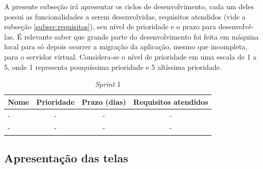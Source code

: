 A presente subseção irá apresentar os ciclos de desenvolvimento, cada um deles possui as funcionalidades a serem desenvolvidas, requisitos atendidos (vide a subseção \ref{subsec:requisitos}), seu nível de prioridade e o prazo para desenvolvê-las. É relevante saber que grande parte do desenvolvimento foi feita em máquina local para só depois ocorrer a migração da aplicação, mesmo que incompleta, para o servidor virtual. Considera-se o nível de prioridade em uma escala de 1 a 5, onde 1 representa pouquíssima prioridade e 5 altíssima prioridade. 


\begin{table}[h]
\centering
{}
\caption{\textit{Sprint} 1}
\vspace{0.5cm}
\begin{tabular}{l|c|c|c}
 
\textbf{Nome} & \textbf{Prioridade} & \textbf{Prazo (dias)} & \textbf{Requisitos atendidos}  \\ %
\hline                               %
- & - & - & - \\
- & - & - & - \\
\hline
\end{tabular}
\label{sprint1}
\end{table}

\hspace{2.5cm}
\subsection{Apresentação das telas}
\label{subsec:telas}
\hspace{2.5cm}

\hspace{2.5cm}
